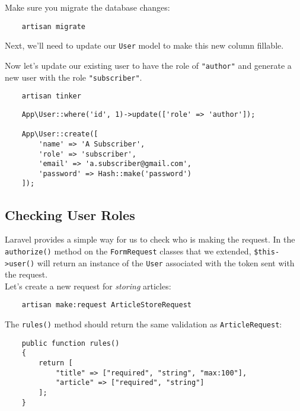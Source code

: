 Make sure you migrate the database changes:

\begin{verbatim}
    artisan migrate
\end{verbatim}

Next, we'll need to update our \texttt{User} model to make this new column fillable.


Now let's update our existing user to have the role of \texttt{"author"} and generate a new user with the role \texttt{"subscriber"}.

\begin{verbatim}
    artisan tinker
\end{verbatim}

\begin{verbatim}
    App\User::where('id', 1)->update(['role' => 'author']);

    App\User::create([
        'name' => 'A Subscriber',
        'role' => 'subscriber',
        'email' => 'a.subscriber@gmail.com',
        'password' => Hash::make('password')
    ]);
\end{verbatim}


\subsection{Checking User Roles}

Laravel provides a simple way for us to check who is making the request. In the \texttt{authorize()} method on the \texttt{FormRequest} classes that we extended, \texttt{\$this->user()} will return an instance of the \texttt{User} associated with the token sent with the request.
\\

Let's create a new request for \textit{storing} articles:

\begin{verbatim}
    artisan make:request ArticleStoreRequest
\end{verbatim}

The \texttt{rules()} method should return the same validation as \texttt{ArticleRequest}:

\begin{verbatim}
    public function rules()
    {
        return [
            "title" => ["required", "string", "max:100"],
            "article" => ["required", "string"]
        ];
    }
\end{verbatim}

